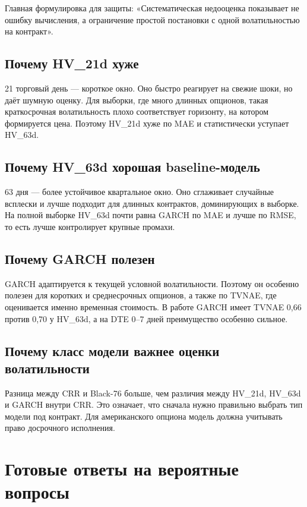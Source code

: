 \documentclass[11pt,a4paper]{article}
\begin{document}
Главная формулировка для защиты: «Систематическая недооценка показывает не ошибку вычисления, а ограничение простой постановки с одной волатильностью на контракт».

\subsection{Почему HV\_21d хуже}

21 торговый день --- короткое окно. Оно быстро реагирует на свежие шоки, но даёт шумную оценку. Для выборки, где много длинных опционов, такая краткосрочная волатильность плохо соответствует горизонту, на котором формируется цена. Поэтому HV\_21d хуже по MAE и статистически уступает HV\_63d.

\subsection{Почему HV\_63d хорошая baseline-модель}

63 дня --- более устойчивое квартальное окно. Оно сглаживает случайные всплески и лучше подходит для длинных контрактов, доминирующих в выборке. На полной выборке HV\_63d почти равна GARCH по MAE и лучше по RMSE, то есть лучше контролирует крупные промахи.

\subsection{Почему GARCH полезен}

GARCH адаптируется к текущей условной волатильности. Поэтому он особенно полезен для коротких и среднесрочных опционов, а также по TVNAE, где оценивается именно временная стоимость. В работе GARCH имеет TVNAE 0,66 против 0,70 у HV\_63d, а на DTE 0--7 дней преимущество особенно сильное.

\subsection{Почему класс модели важнее оценки волатильности}

Разница между CRR и Black-76 больше, чем различия между HV\_21d, HV\_63d и GARCH внутри CRR. Это означает, что сначала нужно правильно выбрать тип модели под контракт. Для американского опциона модель должна учитывать право досрочного исполнения.

\section{Готовые ответы на вероятные вопросы}
\end{document}
